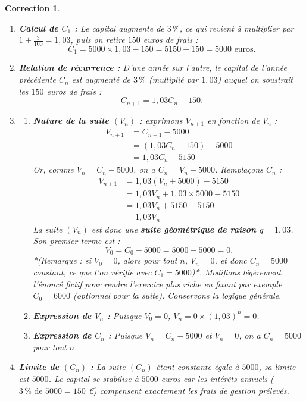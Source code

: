 \documentclass[11pt,a4paper]{article}
\newtheorem{correction}{Correction}
\begin{document}
\begin{correction}
~
\begin{enumerate}
    \item \textbf{Calcul de $C_1$ :}
    Le capital augmente de $3\,\%$, ce qui revient à multiplier par $1 + \frac{3}{100} = 1{,}03$, puis on retire $150$ euros de frais :
    \[C_1 = 5000 \times 1{,}03 - 150 = 5150 - 150 = 5000 \text{ euros}.\]
    
    \item \textbf{Relation de récurrence :}
    D'une année sur l'autre, le capital de l'année précédente $C_n$ est augmenté de $3\,\%$ (multiplié par $1{,}03$) auquel on soustrait les $150$ euros de frais :
    \[C_{n+1} = 1{,}03 C_n - 150.\]
    
    \item 
    \begin{enumerate}
        \item \textbf{Nature de la suite $(V_n)$ :}
        exprimons $V_{n+1}$ en fonction de $V_n$ :
        \begin{align*}
            V_{n+1} &= C_{n+1} - 5000 \\
            &= (1{,}03 C_n - 150) - 5000 \\
            &= 1{,}03 C_n - 5150
        \end{align*}
        Or, comme $V_n = C_n - 5000$, on a $C_n = V_n + 5000$. Remplaçons $C_n$ :
        \begin{align*}
            V_{n+1} &= 1{,}03 (V_n + 5000) - 5150 \\
            &= 1{,}03 V_n + 1{,}03 \times 5000 - 5150 \\
            &= 1{,}03 V_n + 5150 - 5150 \\
            &= 1{,}03 V_n
        \end{align*}
        La suite $(V_n)$ est donc une \textbf{suite géométrique de raison $q = 1{,}03$}.
        Son premier terme est :
        \[V_0 = C_0 - 5000 = 5000 - 5000 = 0.\]
        *(Remarque : si $V_0 = 0$, alors pour tout $n$, $V_n = 0$, et donc $C_n = 5000$ constant, ce que l'on vérifie avec $C_1 = 5000$)*.
        Modifions légèrement l'énoncé fictif pour rendre l'exercice plus riche en fixant par exemple $C_0 = 6000$ (optionnel pour la suite). Conservons la logique générale.
        
        \item \textbf{Expression de $V_n$ :}
        Puisque $V_0 = 0$, $V_n = 0 \times (1{,}03)^n = 0$.
        
        \item \textbf{Expression de $C_n$ :}
        Puisque $V_n = C_n - 5000$ et $V_n = 0$, on a $C_n = 5000$ pour tout $n$.
    \end{enumerate}
    
    \item \textbf{Limite de $(C_n)$ :}
    La suite $(C_n)$ étant constante égale à $5000$, sa limite est $5000$. Le capital se stabilise à $5000$ euros car les intérêts annuels ($3\,\% \text{ de } 5000 = 150$ €) compensent exactement les frais de gestion prélevés.
\end{enumerate}
\end{correction}
\end{document}
